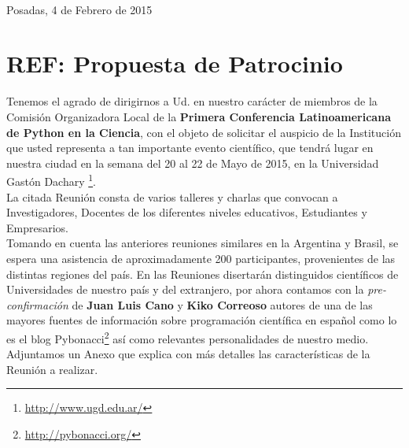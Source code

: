 \documentclass[11pt,a4paper]{report}
\begin{document}
\begin{center}
\end{center}



\hfill \\[0.2cm] Posadas, 4 de Febrero de 2015\\[0.4cm]

\section*{REF: Propuesta de Patrocinio}

Tenemos el agrado de dirigirnos a Ud. en nuestro carácter de miembros de la Comisión Organizadora Local de la \textbf{Primera Conferencia Latinoamericana de Python en la Ciencia}, con el objeto de solicitar el auspicio de la Institución que usted representa a tan importante evento científico, que tendrá lugar en nuestra ciudad en la semana del 20 al 22 de Mayo de 2015, en la Universidad Gastón Dachary
\footnote{\url{http://www.ugd.edu.ar/}}. \\
        La citada Reunión consta de varios talleres y charlas  que convocan a
        Investigadores, Docentes de los diferentes niveles educativos,
        Estudiantes  y Empresarios. \\[0.2cm]

        Tomando en cuenta las anteriores reuniones similares en la Argentina y
        Brasil, se espera una asistencia de aproximadamente 200 participantes,
        provenientes de las distintas regiones del país. En las Reuniones
        disertarán distinguidos científicos de Universidades de nuestro país y
        del extranjero, por ahora contamos con la \emph{pre-confirmación} de
        \textbf{Juan Luis Cano} y \textbf{Kiko Correoso} autores de una de las
        mayores fuentes de información sobre programación científica en español
        como lo es el blog Pybonacci\footnote{\url{http://pybonacci.org/}} así
        como relevantes personalidades de nuestro medio. Adjuntamos un Anexo
        que explica con más detalles las características de la
        Reunión a realizar.\\[0.2cm]
\end{document}

